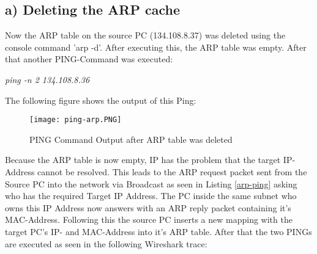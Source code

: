 \subsection{a) Deleting the ARP cache}
\label{apr1}
Now the ARP table on the source PC (134.108.8.37) was deleted using the console command 'arp -d'. After executing this, the ARP table was empty. After that another PING-Command was executed:\\
\begin{center}
	\textit{ping -n 2 134.108.8.36}
\end{center}
The following figure shows the output of this Ping:
\begin{figure}[H]
	\centering
	\texttt{[image: ping-arp.PNG]}
	\caption{PING Command Output after ARP table was deleted}
	\label{ping-arp}
\end{figure} 
Because the ARP table is now empty, IP has the problem that the target IP-Address cannot be resolved. This leads to the ARP request packet sent from the Source PC into the network via Broadcast as seen in Listing \ref{arp-ping} asking who has the required Target IP Address. The PC inside the same subnet who owns this IP Address now answers with an ARP reply packet containing it's MAC-Address. Following this the source PC inserts a new mapping with the target PC's IP- and MAC-Address into it's ARP table. After that the two PINGs are executed as seen in the following Wireshark trace:\\

